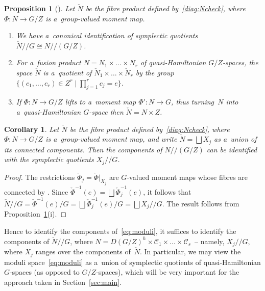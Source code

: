 \documentclass[pdftex]{sigma}
\numberwithin{equation}{section}
\newtheorem{Corollary}[Theorem]{Corollary}
\newtheorem{Proposition}[Theorem]{Proposition}
{\theoremstyle{definition}
\newtheorem{Definition}[Theorem]{Definition}
\newtheorem{Example}[Theorem]{Example}
\newtheorem{Remark}[Theorem]{Remark}
}
\begin{document}
\begin{Proposition}[]
\label{prop:pb}
Let $\check{N}$ be the fibre product defined by~\eqref{diag:Ncheck}, where $\Phi:N\to G/Z$ is a~group-valued moment map.

\begin{enumerate}\itemsep=0pt
\item[$i)$]
We have a~canonical identification of symplectic quotients $\check{N}/ / G \cong N/ / (G/Z)$.
\item[$ii)$]
For a~fusion product $N={N}_1\times \dots \times {N}_r$ of quasi-Hamiltonian ${G/Z}$-spaces, the space $\check{N}$ is
a~quotient of $\check{N}_1\times\dots \times \check{N}_r$ by the group $\big\{(c_1,\ldots,c_r)\in Z^r \mid \prod\limits_{j=1}^r c_j=e\big\}$.
\item[$iii)$]
If $\Phi\colon N\to G/Z$ lifts to a~moment map $\Phi'\colon N\to {G}$, thus turning~$N$ into a~quasi-Hamiltonian
${G}$-space   then $ \check{N}=N\times Z$.
\end{enumerate}
\end{Proposition}

\begin{Corollary}
\label{cor:comps}
Let $\check{N}$ be the fibre product defined by~\eqref{diag:Ncheck}, where $\Phi:N\to G/Z$ is a~group-valued moment
map, and write $\check{N}=\bigsqcup X_j$ as a~union of its connected components.
Then the components of $N/ /(G/Z)$ can be identified with the symplectic quotients $X_j/ /G$.
\end{Corollary}

\begin{proof}
The restrictions $\check{\Phi}_j=\check{\Phi}|_{X_j}$ are $G$-valued moment maps whose f\/ibres are connected by \cite[Theorem~7.2]{AMM}.
Since $\check{\Phi}^{-1}(e) = \bigsqcup \check{\Phi}_j^{-1}(e)$, it follows that $\check{N}/ /G = \check{\Phi}^{-1}(e)/G
= \bigsqcup \check{\Phi}_j^{-1}(e)/G=\bigsqcup X_j/ /G$.
The result follows from Proposition~\ref{prop:pb}(i). %
\end{proof}

Hence to identify the components of~\eqref{eq:moduli}, it suf\/f\/ices to identify the components of $\check{N} / /G$, where
$N= D(G/Z)^h\times\mathcal{C}_1 \times \dots \times \mathcal{C}_s $~-- namely, $X_j/ /G$, where $X_j$ ranges over the
components of~$\check{N}$.
In particular, we may view the moduli space~\eqref{eq:moduli} as a~union of symplectic quotients of
quasi-Hamiltonian $G$-spaces (as opposed to $G/Z$-spaces), which will be very important for the approach taken in
Section~\ref{sec:main}.
\end{document}
